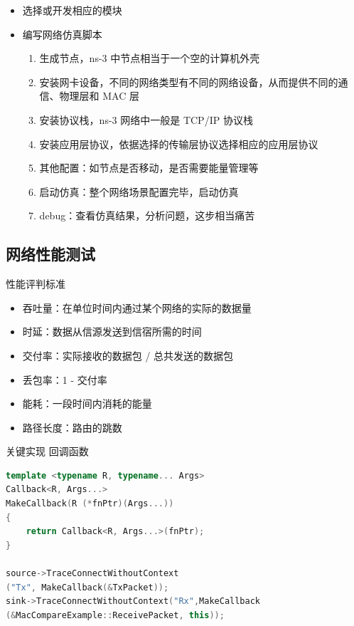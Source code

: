 \documentclass{beamer}
\begin{document}
\begin{frame}
	\begin{itemize}
		\item 选择或开发相应的模块
		\item 编写网络仿真脚本
		      \begin{enumerate}
			      \item 生成节点，ns-3 中节点相当于一个空的计算机外壳
			      \item 安装网卡设备，不同的网络类型有不同的网络设备，从而提供不同的通信、物理层和 MAC 层
			      \item 安装协议栈，ns-3 网络中一般是 TCP/IP 协议栈
			      \item 安装应用层协议，依据选择的传输层协议选择相应的应用层协议
			      \item 其他配置：如节点是否移动，是否需要能量管理等
			      \item 启动仿真：整个网络场景配置完毕，启动仿真
			      \item debug：查看仿真结果，分析问题，这步相当痛苦
		      \end{enumerate}
	\end{itemize}
\end{frame}

\subsection{网络性能测试}

\begin{frame}{性能评判标准}
	\begin{itemize}
		\item 吞吐量：在单位时间内通过某个网络的实际的数据量
		\item 时延：数据从信源发送到信宿所需的时间
		\item 交付率：实际接收的数据包 / 总共发送的数据包
		\item 丢包率：1 - 交付率
		\item 能耗：一段时间内消耗的能量
		\item 路径长度：路由的跳数
	\end{itemize}
\end{frame}

\begin{frame}[fragile]{关键实现}
	回调函数
	\begin{lstlisting}[language=C++]
template <typename R, typename... Args>
Callback<R, Args...>
MakeCallback(R (*fnPtr)(Args...))
{
    return Callback<R, Args...>(fnPtr);
}

source->TraceConnectWithoutContext
("Tx", MakeCallback(&TxPacket));
sink->TraceConnectWithoutContext("Rx",MakeCallback
(&MacCompareExample::ReceivePacket, this));
\end{lstlisting}
\end{frame}
\end{document}
